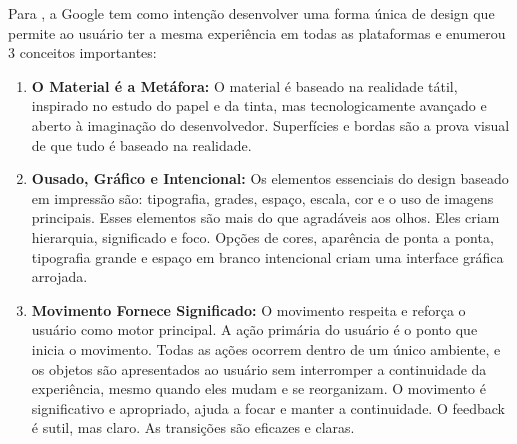 Para , a Google tem como intenção desenvolver uma forma única de design que permite ao usuário ter a mesma experiência em todas as plataformas e enumerou 3 conceitos importantes:

\begin{enumerate}
    \item \textbf{O Material é a Metáfora:} O material é baseado na realidade tátil, inspirado no estudo do papel e da tinta, mas tecnologicamente avançado e aberto à imaginação do desenvolvedor. Superfícies e bordas são a prova visual de que tudo é baseado na realidade.
    \item \textbf{Ousado, Gráfico e Intencional:} Os elementos essenciais do design baseado em impressão são: tipografia, grades, espaço, escala, cor e o uso de imagens principais. Esses elementos são mais do que agradáveis aos olhos. Eles criam hierarquia, significado e foco. Opções de cores, aparência de ponta a ponta, tipografia grande e espaço em branco intencional criam uma interface gráfica arrojada.
    \item \textbf{Movimento Fornece Significado:} O movimento respeita e reforça o usuário como motor principal. A ação primária do usuário é o ponto que inicia o movimento. Todas as ações ocorrem dentro de um único ambiente, e os objetos são apresentados ao usuário sem interromper a continuidade da experiência, mesmo quando eles mudam e se reorganizam. O movimento é significativo e apropriado, ajuda a focar e manter a continuidade. O feedback é sutil, mas claro. As transições são eficazes e claras.
\end{enumerate}